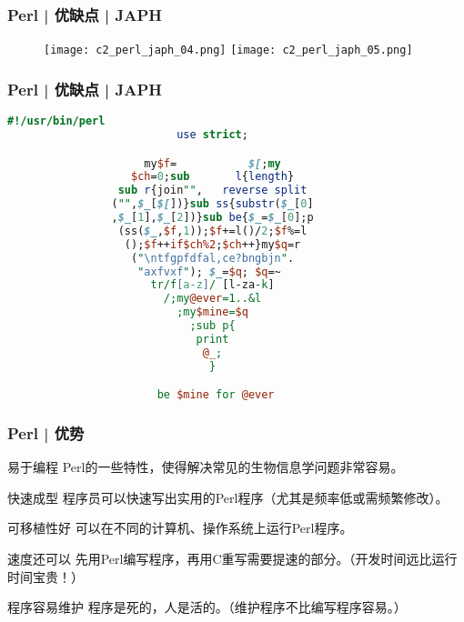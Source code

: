 \begin{frame}
  \frametitle{Perl | 优缺点 | JAPH}
  \begin{figure}
    \centering
    \texttt{[image: c2\_perl\_japh\_04.png]}
    \quad
    \texttt{[image: c2\_perl\_japh\_05.png]}
  \end{figure}
\end{frame}

\begin{frame}[fragile]
  \frametitle{Perl | 优缺点 | JAPH}
  \vspace{-1.5em}
\begin{lstlisting}[language=Perl,basicstyle=\scriptsize\tt]
                        #!/usr/bin/perl
                          use strict;

                     my$f=           $[;my
                   $ch=0;sub       l{length}
                 sub r{join"",   reverse split
                ("",$_[$[])}sub ss{substr($_[0]
                ,$_[1],$_[2])}sub be{$_=$_[0];p
                 (ss($_,$f,1));$f+=l()/2;$f%=l 
                  ();$f++if$ch%2;$ch++}my$q=r
                   ("\ntfgpfdfal,ce?bngbjn".    
                    "axfvxf"); $_=$q; $q=~
                      tr/f[a-z]/ [l-za-k]
                        /;my@ever=1..&l
                          ;my$mine=$q
                            ;sub p{
                             print
                              @_;
                               }

                       be $mine for @ever
\end{lstlisting} 
\end{frame}

\begin{frame}
  \frametitle{Perl | 优势}
  \begin{block}{易于编程}
    Perl的一些特性，使得解决常见的生物信息学问题非常容易。
  \end{block}
  \pause
  \begin{block}{快速成型}
    程序员可以快速写出实用的Perl程序（尤其是频率低或需频繁修改）。
  \end{block}
  \pause
  \begin{block}{可移植性好}
    可以在不同的计算机、操作系统上运行Perl程序。
  \end{block}
  \pause
  \begin{block}{速度还可以}
    先用Perl编写程序，再用C重写需要提速的部分。（\alert{开发时间远比运行时间宝贵！}）
  \end{block}
  \pause
  \begin{block}{程序容易维护}
    程序是死的，人是活的。（\alert{维护程序不比编写程序容易。}）
  \end{block}
\end{frame}

